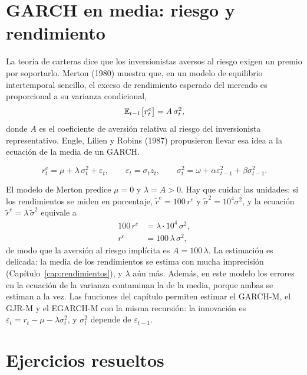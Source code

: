 \section{GARCH en media: riesgo y rendimiento}

La teoría de carteras dice que los inversionistas aversos al riesgo exigen un premio por soportarlo. Merton
(1980) muestra que, en un modelo de equilibrio intertemporal sencillo, el exceso de rendimiento esperado del
mercado es proporcional a su varianza condicional,
\[
  \mathbb{E}_{t-1}\bigl[r^e_t\bigr]=A\,\sigma_t^2,
\]
donde $A$ es el coeficiente de aversión relativa al riesgo del inversionista representativo. Engle, Lilien y
Robins (1987) propusieron llevar esa idea a la ecuación de la media de un GARCH.

\begin{definicion}
\[
  r^e_t=\mu+\lambda\,\sigma_t^2+\varepsilon_t,\qquad \varepsilon_t=\sigma_tz_t,\qquad
  \sigma_t^2=\omega+\alpha\varepsilon_{t-1}^2+\beta\sigma_{t-1}^2 .
\]
\end{definicion}

El modelo de Merton predice $\mu=0$ y $\lambda=A>0$. Hay que cuidar las unidades: si los rendimientos se miden
en porcentaje, $\tilde r^e=100\,r^e$ y $\tilde\sigma^2=10^4\sigma^2$, y la ecuación $\tilde r^e=\lambda\,\tilde\sigma^2$
equivale a
\begin{align*}
  100\,r^e &= \lambda\cdot10^4\,\sigma^2,\\
  r^e      &= 100\,\lambda\,\sigma^2,
\end{align*}
de modo que la aversión al riesgo implícita es $A=100\,\lambda$. La estimación es delicada: la media de los
rendimientos se estima con mucha imprecisión (Capítulo~\ref{cap:rendimientos}), y $\lambda$ aún más. Además, en
este modelo los errores en la ecuación de la varianza contaminan la de la media, porque ambas se estiman a la
vez. Las funciones del capítulo permiten estimar el GARCH-M, el GJR-M y el EGARCH-M con la misma recursión: la
innovación es $\varepsilon_t=r_t-\mu-\lambda\sigma_t^2$, y $\sigma_t^2$ depende de $\varepsilon_{t-1}$.

\section{Ejercicios resueltos}


